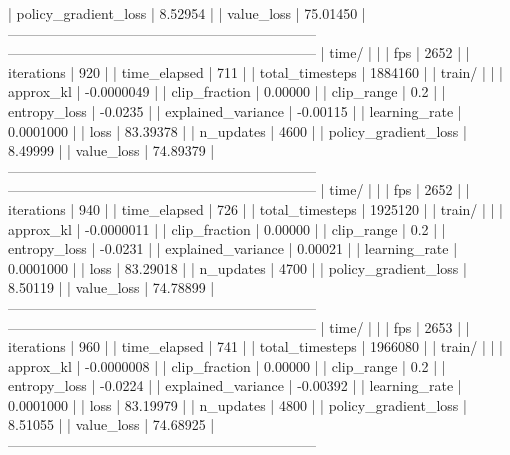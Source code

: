 |    policy_gradient_loss |      8.52954 |
|    value_loss           |     75.01450 |
------------------------------------------------------------------
------------------------------------------------------------------
| time/                   |              |
|    fps                  |         2652 |
|    iterations           |          920 |
|    time_elapsed         |          711 |
|    total_timesteps      |      1884160 |
| train/                  |              |
|    approx_kl            |   -0.0000049 |
|    clip_fraction        |      0.00000 |
|    clip_range           |          0.2 |
|    entropy_loss         |      -0.0235 |
|    explained_variance   |     -0.00115 |
|    learning_rate        |    0.0001000 |
|    loss                 |     83.39378 |
|    n_updates            |         4600 |
|    policy_gradient_loss |      8.49999 |
|    value_loss           |     74.89379 |
------------------------------------------------------------------
------------------------------------------------------------------
| time/                   |              |
|    fps                  |         2652 |
|    iterations           |          940 |
|    time_elapsed         |          726 |
|    total_timesteps      |      1925120 |
| train/                  |              |
|    approx_kl            |   -0.0000011 |
|    clip_fraction        |      0.00000 |
|    clip_range           |          0.2 |
|    entropy_loss         |      -0.0231 |
|    explained_variance   |      0.00021 |
|    learning_rate        |    0.0001000 |
|    loss                 |     83.29018 |
|    n_updates            |         4700 |
|    policy_gradient_loss |      8.50119 |
|    value_loss           |     74.78899 |
------------------------------------------------------------------
------------------------------------------------------------------
| time/                   |              |
|    fps                  |         2653 |
|    iterations           |          960 |
|    time_elapsed         |          741 |
|    total_timesteps      |      1966080 |
| train/                  |              |
|    approx_kl            |   -0.0000008 |
|    clip_fraction        |      0.00000 |
|    clip_range           |          0.2 |
|    entropy_loss         |      -0.0224 |
|    explained_variance   |     -0.00392 |
|    learning_rate        |    0.0001000 |
|    loss                 |     83.19979 |
|    n_updates            |         4800 |
|    policy_gradient_loss |      8.51055 |
|    value_loss           |     74.68925 |
------------------------------------------------------------------
